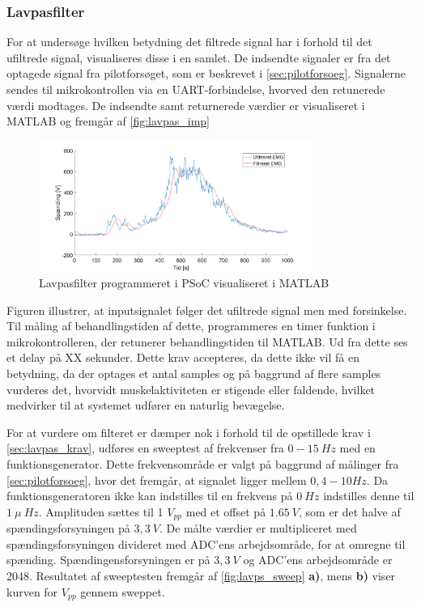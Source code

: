 \subsubsection{Lavpasfilter}
For at undersøge hvilken betydning det filtrede signal har i forhold til det ufiltrede signal, visualiseres disse i en samlet. De indsendte signaler er fra det optagede signal fra pilotforsøget, som er beskrevet i \autoref{sec:pilotforsoeg}. Signalerne sendes til mikrokontrollen via en UART-forbindelse, hvorved den retunerede værdi modtages. De indsendte samt returnerede værdier er visualiseret i MATLAB og fremgår af \autoref{fig:lavpas_imp}

\begin{figure}[H]
\centering
\includegraphics[width=0.8\textwidth]{figures/EMG_test}
\caption{Lavpasfilter programmeret i PSoC visualiseret i MATLAB}
\label{fig:lavpas_imp}
\end{figure}

\noindent
Figuren illustrer, at inputsignalet følger det ufiltrede signal men med forsinkelse. Til måling af behandlingstiden af dette, programmeres en timer funktion i mikrokontrolleren, der retunerer behandlingstiden til MATLAB. Ud fra dette ses et delay på XX sekunder. Dette krav accepteres, da dette ikke vil få en betydning, da der optages et antal samples og på baggrund af flere samples vurderes det, hvorvidt muskelaktiviteten er stigende eller faldende, hvilket medvirker til at systemet udfører en naturlig bevægelse.


For at vurdere om filteret er dæmper nok i forhold til de opstillede krav i \autoref{sec:lavpas_krav}, udføres en sweeptest af frekvenser fra $0-15~Hz$ med en funktionsgenerator. Dette frekvensområde er valgt på baggrund af målinger fra \autoref{sec:pilotforsoeg}, hvor det fremgår, at signalet ligger mellem $0,4-10Hz$.  Da funktionsgeneratoren ikke kan indstilles til en frekvens på $0~Hz$ indstilles denne til $1~\mu~Hz$. Amplituden sættes til 1 $V_{pp}$ med et offset på $1.65~V$, som er det halve af spændingsforsyningen på $3,3~V$. De målte værdier er multipliceret med spændingsforsyningen divideret med ADC'ens arbejdsområde, for at omregne til spænding. Spændingensforsyningen er på $3,3~V$ og ADC'ens arbejdsområde er 2048. Resultatet af sweeptesten fremgår af \autoref{fig:lavps_sweep} \textbf{a)}, mens \textbf{b)} viser kurven for $V_{pp}$ gennem sweppet.

